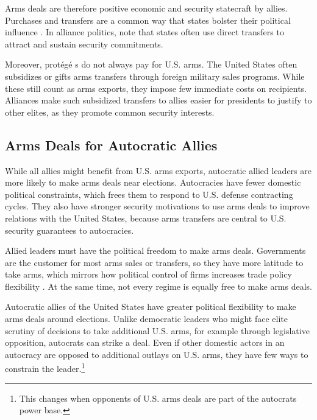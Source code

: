 \documentclass[12pt]{article}
\begin{document}
Arms deals are therefore positive economic and security statecraft by allies. 
Purchases and transfers are a common way that states bolster their political influence \citep[pg. 42-3]{Baldwin2020}.
In alliance politics, \citet[pg. 184-5]{IkenberryGrieco2003} note that states often use direct transfers to attract and sustain security commitments.  


Moreover, prot{\'e}g{\'e} s do not always pay for U.S. arms.
The United States often subsidizes or gifts arms transfers through foreign military sales programs. 
While these still count as arms exports, they impose few immediate costs on recipients.
Alliances make such subsidized transfers to allies easier for presidents to justify to other elites, as they promote common security interests. 


\subsection{Arms Deals for Autocratic Allies}


While all allies might benefit from U.S. arms exports, autocratic allied leaders are more likely to make arms deals near elections. 
Autocracies have fewer domestic political constraints, which frees them to respond to U.S. defense contracting cycles.
They also have stronger security motivations to use arms deals to improve relations with the United States, because arms transfers are central to U.S. security guarantees to autocracies.


Allied leaders must have the political freedom to make arms deals.
Governments are the customer for most arms sales or transfers, so they have more latitude to take arms, which mirrors how political control of firms increases trade policy flexibility \citep{Davisetal2019}.
At the same time, not every regime is equally free to make arms deals. 


Autocratic allies of the United States have greater political flexibility to make arms deals around elections. 
Unlike democratic leaders who might face elite scrutiny of decisions to take additional U.S. arms, for example through legislative opposition, autocrats can strike a deal. 
Even if other domestic actors in an autocracy are opposed to additional outlays on U.S. arms, they have few ways to constrain the leader.\footnote{This changes when opponents of U.S. arms deals are part of the autocrats power base.}
\end{document}
